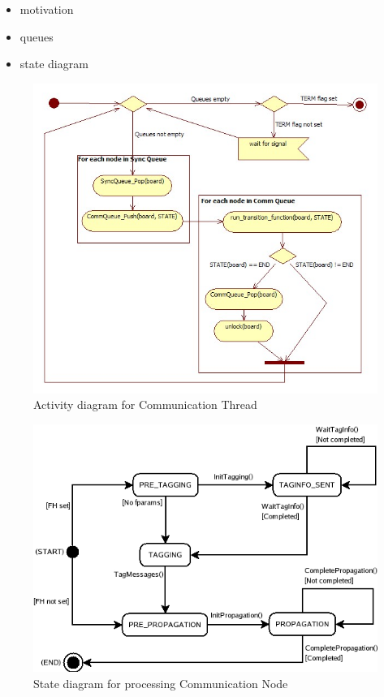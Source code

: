 \begin{itemize}
\item motivation
\item queues
\item state diagram
\end{itemize} 



\begin{figure}[h]
 \centering
  \includegraphics[scale=0.50]{commloop.jpg}
 \caption{Activity diagram for Communication Thread}
 \label{fig:commloop}
\end{figure}

\begin{figure}[h]
 \centering
  \includegraphics[scale=0.50]{CommNode.png}
 \caption{State diagram for processing Communication Node}
 \label{fig:commstate}
\end{figure}

